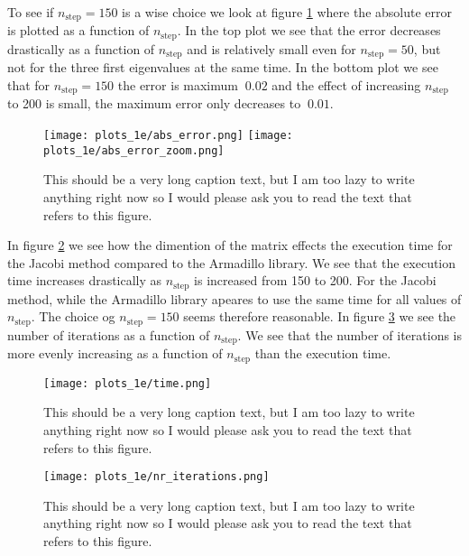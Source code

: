 \documentclass[11pt,a4wide]{article}
\begin{document}
To see if $n_{\mathrm{step}}=150$ is a wise choice we look at figure \ref{fig: abs.err_n} where the absolute error is plotted as a function of $n_{\mathrm{step}}$. In the top plot we see that the error decreases drastically as a function of $n_{\mathrm{step}}$ and is relatively small even for $n_{\mathrm{step}}=50$, but not for the three first eigenvalues at the same time. In the bottom plot we see that for $n_{\mathrm{step}}=150$ the error is maximum $~0.02$ and the effect of increasing $n_{\mathrm{step}}$ to 200 is small, the maximum error only decreases to $~0.01$.

\begin{figure} [htp]
\centering
\texttt{[image: plots\_1e/abs\_error.png]}
\texttt{[image: plots\_1e/abs\_error\_zoom.png]}
\caption{This should be a very long caption text, but I am too lazy to write anything right now so I would please ask you to read the text that refers to this figure.}
\label{fig: abs.err_n}
\end{figure}

In figure \ref{fig: time} we see how the dimention of the matrix effects the execution time for the Jacobi method compared to the Armadillo library. We see that the execution time increases drastically as $n_{\mathrm{step}}$ is increased from 150 to 200. For the Jacobi method, while the Armadillo library apeares to use the same time for all values of  $n_{\mathrm{step}}$. The choice og $n_{\mathrm{step}}=150$ seems therefore reasonable. In figure \ref{fig: nr_iter} we see the number of iterations as a function of $n_{\mathrm{step}}$. We see that the number of iterations is more evenly increasing as a function of $n_{\mathrm{step}}$ than the execution time. 

\begin{figure} [htp]
\centering
\texttt{[image: plots\_1e/time.png]}
\caption{This should be a very long caption text, but I am too lazy to write anything right now so I would please ask you to read the text that refers to this figure.}
\label{fig: time}
\end{figure}

\begin{figure} [htp]
\centering
\texttt{[image: plots\_1e/nr\_iterations.png]}
\caption{This should be a very long caption text, but I am too lazy to write anything right now so I would please ask you to read the text that refers to this figure.}
\label{fig: nr_iter}
\end{figure}
\end{document}
